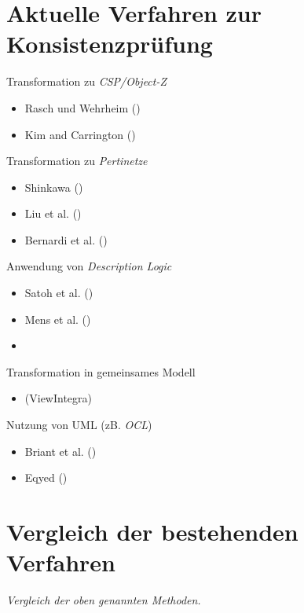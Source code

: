 \section{Aktuelle Verfahren zur Konsistenzprüfung}

Transformation zu \emph{CSP/Object-Z}
\begin{itemize}
    \item Rasch und Wehrheim (\cite{Usman2008})
    \item Kim and Carrington (\cite{Usman2008})
\end{itemize}

Transformation zu \emph{Pertinetze}
\begin{itemize}
    \item Shinkawa (\cite{Usman2008})
    \item Liu et al. (\cite{Usman2008})
    \item Bernardi et al. (\cite{Usman2008})
\end{itemize}

Anwendung von \emph{Description Logic}
\begin{itemize}
    \item Satoh et al. (\cite{Usman2008})
    \item Mens et al. (\cite{Usman2008})
    \item \cite{Simmonds2004}
\end{itemize}

Transformation in gemeinsames Modell
\begin{itemize}
    \item \cite{Egyed2001} (ViewIntegra)
\end{itemize}

Nutzung von UML (zB. \emph{OCL})
\begin{itemize}
    \item Briant et al. (\cite{Usman2008})
    \item Eqyed (\cite{Usman2008})
\end{itemize}

\section{Vergleich der bestehenden Verfahren}

\textit{Vergleich der oben genannten Methoden.}

